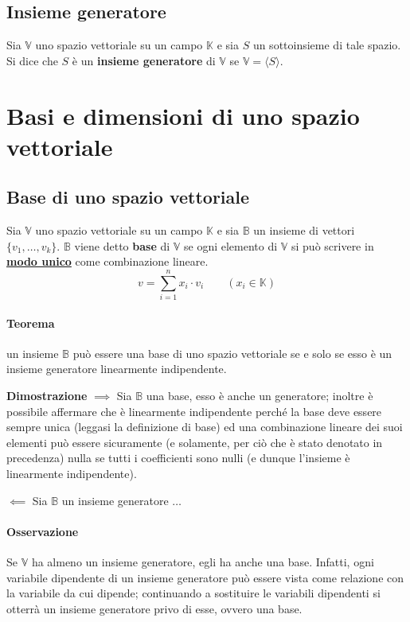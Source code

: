 		
		\subsection{Insieme generatore}
			Sia $\mathbb{V}$ uno spazio vettoriale su un campo $\mathbb{K}$ e sia $S$ un sottoinsieme di tale spazio. Si dice che $S$ è un \textbf{insieme generatore} di $\mathbb{V}$ se $\mathbb{V} = \langle S \rangle $.
			
	\section{Basi e dimensioni di uno spazio vettoriale}
		\subsection{Base di uno spazio vettoriale}
			Sia $\mathbb{V}$ uno spazio vettoriale su un campo $\mathbb{K}$ e sia $\mathbb{B}$ un insieme di vettori $\{ v_1, \dots, v_k \}$.
			$\mathbb{B}$ viene detto \textbf{base} di $\mathbb{V}$ se ogni elemento di $\mathbb{V}$ si può scrivere in \underline{\textbf{modo unico}} come combinazione lineare.
			$$ v = \sum_{i=1}^{n} x_i \cdot v_i \qquad (x_i \in \mathbb{K}) $$
			
			\paragraph{Teorema} un insieme $\mathbb{B}$ può essere una base di uno spazio vettoriale se e solo se esso è un insieme generatore linearmente indipendente.
			\begin{GrayBox}
				\textbf{Dimostrazione} \newline
				\textbf{$\implies$} Sia $\mathbb{B}$ una base, esso è anche un generatore; inoltre è possibile affermare che è linearmente indipendente perché la base deve essere sempre unica (leggasi la definizione di base) ed una combinazione lineare dei suoi elementi può essere sicuramente (e solamente, per ciò che è stato denotato in precedenza) nulla se tutti i coefficienti sono nulli (e dunque l'insieme è linearmente indipendente).
				
				\textbf{$\impliedby$} Sia $\mathbb{B}$ un insieme generatore $\dots$
			\end{GrayBox}
		
		\paragraph{Osservazione} Se $\mathbb{V}$ ha almeno un insieme generatore, egli ha anche una base. Infatti, ogni variabile dipendente di un insieme generatore può essere vista come relazione con la variabile da cui dipende; continuando a sostituire le variabili dipendenti si otterrà un insieme generatore privo di esse, ovvero una base.
		
